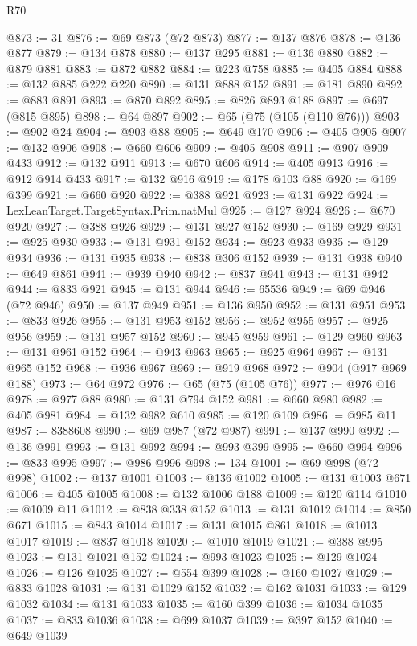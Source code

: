 \begin{lexlean}{R70}
\begin{coremodule}
@873 := 31
@876 := @69 @873 (@72 @873)
@877 := @137 @876
@878 := @136 @877
@879 := @134 @878
@880 := @137 @295
@881 := @136 @880
@882 := @879 @881
@883 := @872 @882
@884 := @223 @758
@885 := @405 @884
@888 := @132 @885 @222 @220
@890 := @131 @888 @152
@891 := @181 @890
@892 := @883 @891
@893 := @870 @892
@895 := @826 @893 @188
@897 := @697 (@815 @895)
@898 := @64 @897
@902 := @65 (@75 (@105 (@110 @76)))
@903 := @902 @24
@904 := @903 @88
@905 := @649 @170
@906 := @405 @905
@907 := @132 @906
@908 := @660 @606
@909 := @405 @908
@911 := @907 @909 @433
@912 := @132 @911
@913 := @670 @606
@914 := @405 @913
@916 := @912 @914 @433
@917 := @132 @916
@919 := @178 @103 @88
@920 := @169 @399
@921 := @660 @920
@922 := @388 @921
@923 := @131 @922
@924 := LexLeanTarget.TargetSyntax.Prim.natMul
@925 := @127 @924
@926 := @670 @920
@927 := @388 @926
@929 := @131 @927 @152
@930 := @169 @929
@931 := @925 @930
@933 := @131 @931 @152
@934 := @923 @933
@935 := @129 @934
@936 := @131 @935
@938 := @838 @306 @152
@939 := @131 @938
@940 := @649 @861
@941 := @939 @940
@942 := @837 @941
@943 := @131 @942
@944 := @833 @921
@945 := @131 @944
@946 := 65536
@949 := @69 @946 (@72 @946)
@950 := @137 @949
@951 := @136 @950
@952 := @131 @951
@953 := @833 @926
@955 := @131 @953 @152
@956 := @952 @955
@957 := @925 @956
@959 := @131 @957 @152
@960 := @945 @959
@961 := @129 @960
@963 := @131 @961 @152
@964 := @943 @963
@965 := @925 @964
@967 := @131 @965 @152
@968 := @936 @967
@969 := @919 @968
@972 := @904 (@917 @969 @188)
@973 := @64 @972
@976 := @65 (@75 (@105 @76))
@977 := @976 @16
@978 := @977 @88
@980 := @131 @794 @152
@981 := @660 @980
@982 := @405 @981
@984 := @132 @982 @610
@985 := @120 @109
@986 := @985 @11
@987 := 8388608
@990 := @69 @987 (@72 @987)
@991 := @137 @990
@992 := @136 @991
@993 := @131 @992
@994 := @993 @399
@995 := @660 @994
@996 := @833 @995
@997 := @986 @996
@998 := 134
@1001 := @69 @998 (@72 @998)
@1002 := @137 @1001
@1003 := @136 @1002
@1005 := @131 @1003 @671
@1006 := @405 @1005
@1008 := @132 @1006 @188
@1009 := @120 @114
@1010 := @1009 @11
@1012 := @838 @338 @152
@1013 := @131 @1012
@1014 := @850 @671
@1015 := @843 @1014
@1017 := @131 @1015 @861
@1018 := @1013 @1017
@1019 := @837 @1018
@1020 := @1010 @1019
@1021 := @388 @995
@1023 := @131 @1021 @152
@1024 := @993 @1023
@1025 := @129 @1024
@1026 := @126 @1025
@1027 := @554 @399
@1028 := @160 @1027
@1029 := @833 @1028
@1031 := @131 @1029 @152
@1032 := @162 @1031
@1033 := @129 @1032
@1034 := @131 @1033
@1035 := @160 @399
@1036 := @1034 @1035
@1037 := @833 @1036
@1038 := @699 @1037
@1039 := @397 @152
@1040 := @649 @1039

\end{coremodule}
\end{lexlean}
